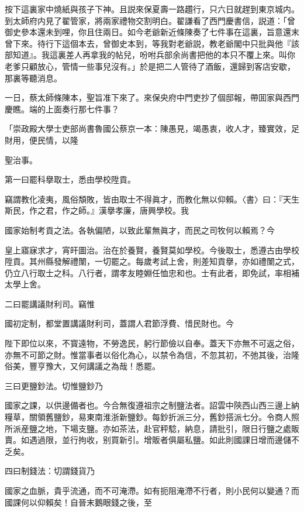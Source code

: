 按下這裏家中燒紙與孩子下神。且説來保夏壽一路趲行，只六日就趕到東京城内。到太師府内見了翟管家，將兩家禮物交割明白。翟謙看了西門慶書信，説道：「曾御史參本還未到哩，你且住兩日。如今老爺新近條陳奏了七件事在這裏，旨意還末曾下來。待行下這個本去，曾御史本到，等我對老爺説，教老爺閣中只批與他『該部知道』。我這裏差人再拿我的帖兒，吩咐兵部余尚書把他的本只不覆上來。叫你老爹只顧放心，管情一些事兒沒有。」於是把二人管待了酒飯，還歸到客店安歇，那裏等聽消息。

一日，蔡太師條陳本，聖旨准下來了。來保央府中門吏抄了個邸報，帶囬家與西門慶瞧。端的上面奏行那七件事？

\begin{myquote}[\markfont]
「崇政殿大學士吏部尚書魯國公蔡京一本：陳愚見，竭愚衷，收人才，臻實效，足財用，便民情，以隆

聖治事。

\hspace*{2em}第一曰罷科擧取士，悉由學校陞貢。

竊謂教化凌夷，風俗頽敗，皆由取士不得眞才，而教化無以仰賴。〈書〉曰：『天生斯民，作之君，作之師。』漢擧孝廉，唐興學校。我

國家始制考貢之法。各執偏陋，以致此輩無眞才，而民之司牧何以賴焉？今

皇上寤寐求才，宵旰圖治。治在於養賢，養賢莫如學校。今後取士，悉遵古由學校陞貢。其州縣發解禮闈，一切罷之。每歲考試上舍，則差知貢擧，亦如禮闈之式，仍立八行取士之科。八行者，謂孝友睦婣任恤忠和也。士有此者，即免試，率相補太學上舍。

\hspace*{2em}二曰罷講議財利司。竊惟

國初定制，都堂置講議財利司，蓋謂人君節浮費、惜民財也。今

陛下即位以來，不寳遠物，不勞逸民，躬行節儉以自奉。蓋天下亦無不可返之俗，亦無不可節之財。惟當事者以俗化為心，以禁令為信，不忽其初，不弛其後，治隆俗美，豐亨豫大，又何講議之為哉！悉罷。

\hspace*{2em}三曰更鹽鈔法。切惟鹽鈔乃

國家之課，以供邊備者也。今合無復遵祖宗之制鹽法者。詔雲中陝西山西三邊上納糧草，關領舊鹽鈔，易東南淮浙新鹽鈔。每鈔折派三分，舊鈔搭派七分。令商人照所派産鹽之地，下場支鹽。亦如茶法，赴官秤騐，納息，請批引，限日行鹽之處販賣。如遇過限，並行拘收，别買新引。增販者俱屬私鹽。如此則國課日增而邊儲不乏矣。

\hspace*{2em}四曰制錢法：切謂錢貨乃

國家之血脈，貴乎流通，而不可淹滯。如有扼阻淹滯不行者，則小民何以變通？而國課何以仰賴矣！自晉末鵝眼錢之後，至


\end{myquote}
